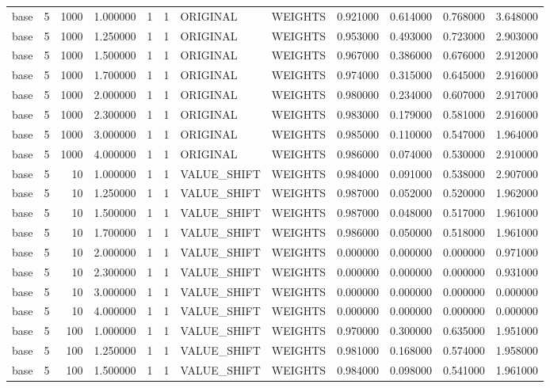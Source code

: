 \begin{tabular}{lrrrllllrrrr}
base & 5 & 1000 & 1.000000 & 1 & 1 & ORIGINAL & WEIGHTS & 0.921000 & 0.614000 & 0.768000 & 3.648000 \\
base & 5 & 1000 & 1.250000 & 1 & 1 & ORIGINAL & WEIGHTS & 0.953000 & 0.493000 & 0.723000 & 2.903000 \\
base & 5 & 1000 & 1.500000 & 1 & 1 & ORIGINAL & WEIGHTS & 0.967000 & 0.386000 & 0.676000 & 2.912000 \\
base & 5 & 1000 & 1.700000 & 1 & 1 & ORIGINAL & WEIGHTS & 0.974000 & 0.315000 & 0.645000 & 2.916000 \\
base & 5 & 1000 & 2.000000 & 1 & 1 & ORIGINAL & WEIGHTS & 0.980000 & 0.234000 & 0.607000 & 2.917000 \\
base & 5 & 1000 & 2.300000 & 1 & 1 & ORIGINAL & WEIGHTS & 0.983000 & 0.179000 & 0.581000 & 2.916000 \\
base & 5 & 1000 & 3.000000 & 1 & 1 & ORIGINAL & WEIGHTS & 0.985000 & 0.110000 & 0.547000 & 1.964000 \\
base & 5 & 1000 & 4.000000 & 1 & 1 & ORIGINAL & WEIGHTS & 0.986000 & 0.074000 & 0.530000 & 2.910000 \\
base & 5 & 10 & 1.000000 & 1 & 1 & VALUE_SHIFT & WEIGHTS & 0.984000 & 0.091000 & 0.538000 & 2.907000 \\
base & 5 & 10 & 1.250000 & 1 & 1 & VALUE_SHIFT & WEIGHTS & 0.987000 & 0.052000 & 0.520000 & 1.962000 \\
base & 5 & 10 & 1.500000 & 1 & 1 & VALUE_SHIFT & WEIGHTS & 0.987000 & 0.048000 & 0.517000 & 1.961000 \\
base & 5 & 10 & 1.700000 & 1 & 1 & VALUE_SHIFT & WEIGHTS & 0.986000 & 0.050000 & 0.518000 & 1.961000 \\
base & 5 & 10 & 2.000000 & 1 & 1 & VALUE_SHIFT & WEIGHTS & 0.000000 & 0.000000 & 0.000000 & 0.971000 \\
base & 5 & 10 & 2.300000 & 1 & 1 & VALUE_SHIFT & WEIGHTS & 0.000000 & 0.000000 & 0.000000 & 0.931000 \\
base & 5 & 10 & 3.000000 & 1 & 1 & VALUE_SHIFT & WEIGHTS & 0.000000 & 0.000000 & 0.000000 & 0.000000 \\
base & 5 & 10 & 4.000000 & 1 & 1 & VALUE_SHIFT & WEIGHTS & 0.000000 & 0.000000 & 0.000000 & 0.000000 \\
base & 5 & 100 & 1.000000 & 1 & 1 & VALUE_SHIFT & WEIGHTS & 0.970000 & 0.300000 & 0.635000 & 1.951000 \\
base & 5 & 100 & 1.250000 & 1 & 1 & VALUE_SHIFT & WEIGHTS & 0.981000 & 0.168000 & 0.574000 & 1.958000 \\
base & 5 & 100 & 1.500000 & 1 & 1 & VALUE_SHIFT & WEIGHTS & 0.984000 & 0.098000 & 0.541000 & 1.961000 \\

\end{tabular}
